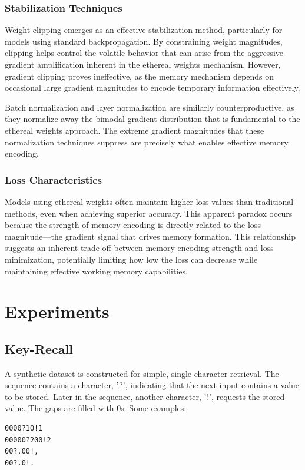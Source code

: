 \documentclass{article} %
\begin{document}
\subsubsection{Stabilization Techniques}

Weight clipping emerges as an effective stabilization method, particularly for models using standard backpropagation. By constraining weight magnitudes, clipping helps control the volatile behavior that can arise from the aggressive gradient amplification inherent in the ethereal weights mechanism. However, gradient clipping proves ineffective, as the memory mechanism depends on occasional large gradient magnitudes to encode temporary information effectively.

Batch normalization and layer normalization are similarly counterproductive, as they normalize away the bimodal gradient distribution that is fundamental to the ethereal weights approach. The extreme gradient magnitudes that these normalization techniques suppress are precisely what enables effective memory encoding.

\subsubsection{Loss Characteristics}

Models using ethereal weights often maintain higher loss values than traditional methods, even when achieving superior accuracy. This apparent paradox occurs because the strength of memory encoding is directly related to the loss magnitude—the gradient signal that drives memory formation. This relationship suggests an inherent trade-off between memory encoding strength and loss minimization, potentially limiting how low the loss can decrease while maintaining effective working memory capabilities.

\section{Experiments}

\subsection{Key-Recall}
A synthetic dataset is constructed for simple, single character retrieval. The sequence contains a character, '?', indicating that the next input contains a value to be stored. Later in the sequence, another character, '!', requests the stored value. The gaps are filled with 0s. Some examples:
\begin{verbatim}
0000?10!1
00000?200!2
00?,00!,
00?.0!.
\end{verbatim}
\end{document}
